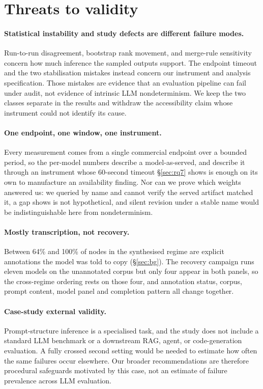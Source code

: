 \documentclass{article}
\begin{document}
\section{Threats to validity}
\label{sec:threats}

\paragraph{Statistical instability and study defects are different failure modes.}
Run-to-run disagreement, bootstrap rank movement, and merge-rule sensitivity concern how much inference the sampled outputs support. The endpoint timeout and the two stabilisation mistakes instead concern our instrument and analysis specification. Those mistakes are evidence that an evaluation pipeline can fail under audit, not evidence of intrinsic LLM nondeterminism. We keep the two classes separate in the results and withdraw the accessibility claim whose instrument could not identify its cause.

\paragraph{One endpoint, one window, one instrument.}
Every measurement comes from a single commercial endpoint over a bounded period, so the per-model numbers describe a model-as-served, and describe it through an instrument whose 60-second timeout \S\ref{sec:rq7} shows is enough on its own to manufacture an availability finding. Nor can we prove which weights answered us: we queried by name and cannot verify the served artifact matched it, a gap \citet{zhang2026shadowapis} shows is not hypothetical, and silent revision under a stable name would be indistinguishable here from nondeterminism.

\paragraph{Mostly transcription, not recovery.}
Between 64\% and 100\% of nodes in the synthesised regime are explicit annotations the model was told to copy (\S\ref{sec:bg}). The recovery campaign runs eleven models on the unannotated corpus but only four appear in both panels, so the cross-regime ordering rests on those four, and annotation status, corpus, prompt content, model panel and completion pattern all change together.

\paragraph{Case-study external validity.}
Prompt-structure inference is a specialised task, and the study does not include a standard LLM benchmark or a downstream RAG, agent, or code-generation evaluation. A fully crossed second setting would be needed to estimate how often the same failures occur elsewhere. Our broader recommendations are therefore procedural safeguards motivated by this case, not an estimate of failure prevalence across LLM evaluation.
\end{document}
